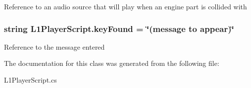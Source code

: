 Reference to an audio source that will play when an engine part is collided with \hypertarget{class_l1_player_script_ac3f3f18561f2bea066a3b06f84e993ea}{
\subsubsection[{key\-Found}]{\setlength{\rightskip}{0pt plus 5cm}string L1\-Player\-Script.\-key\-Found = \char`\"{}(message to appear)\char`\"{}}}\label{class_l1_player_script_ac3f3f18561f2bea066a3b06f84e993ea}
Reference to the message entered 

The documentation for this class was generated from the following file\-:\begin{DoxyCompactItemize}
\item 
L1\-Player\-Script.\-cs\end{DoxyCompactItemize}
